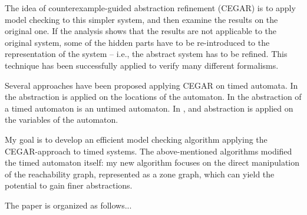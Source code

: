 The idea of counterexample-guided abstraction refinement (CEGAR) \cite{clarke2003counterexample} is to apply 
model checking to this simpler system, and then examine the results on the original one.
If the analysis shows that the results are not applicable to the original system, some of the hidden parts have to be re-introduced to the representation of the system -- i.e.,
the abstract system has to be refined. This technique has been successfully applied to verify many different
formalisms.

Several approaches have been proposed applying CEGAR on timed automata.  In \cite{kemper2007sat}
the abstraction is applied on the locations of the automaton. In
\cite{nagaoka2010abstraction} the abstraction of a timed automaton is an untimed
automaton. In \cite{dierks2007automatic, he2010compositional}, and
\cite{okano2011clock} abstraction is applied on the variables of the automaton.

My goal is to develop an efficient model checking algorithm applying the
CEGAR-approach to timed systems. The above-mentioned algorithms modified the timed automaton itself: my new 
algorithm focuses on the direct manipulation of the reachability graph, represented as a zone graph, which can
yield the potential to gain finer abstractions.

The paper is organized as follows... 


